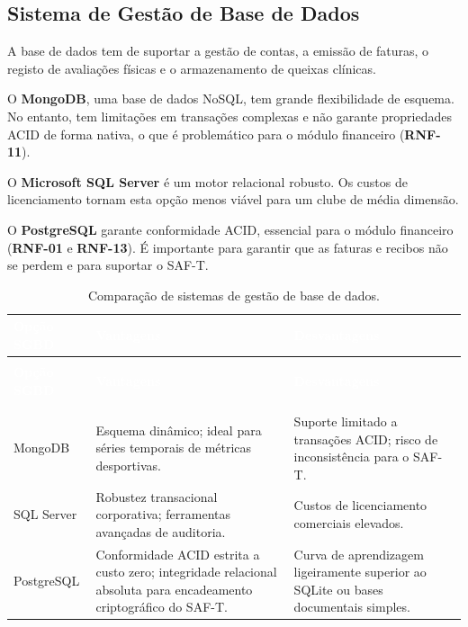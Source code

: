 \subsection{Sistema de Gestão de Base de Dados}

A base de dados tem de suportar a gestão de contas, a emissão de faturas, o registo de avaliações físicas e o armazenamento de queixas clínicas.

O \textbf{MongoDB}, uma base de dados NoSQL, tem grande flexibilidade de esquema. No entanto, tem limitações em transações complexas e não garante propriedades ACID de forma nativa, o que é problemático para o módulo financeiro (\textbf{RNF-11}).

O \textbf{Microsoft SQL Server} é um motor relacional robusto. Os custos de licenciamento tornam esta opção menos viável para um clube de média dimensão.

O \textbf{PostgreSQL} garante conformidade ACID, essencial para o módulo financeiro (\textbf{RNF-01} e \textbf{RNF-13}). É importante para garantir que as faturas e recibos não se perdem e para suportar o SAF-T.
\begin{center}
{\small
{}
\begin{xltabular}{\textwidth}{|>{\raggedright\arraybackslash}p{3cm}|>{\raggedright\arraybackslash}X|>{\raggedright\arraybackslash}X|}
\hline
{}\textcolor{white}{\textbf{Opção SGBD}} & \textcolor{white}{\textbf{Vantagens}} & \textcolor{white}{\textbf{Desvantagens}} \\ \hline
\endfirsthead

 \\
\hline
{}\textcolor{white}{\textbf{Opção SGBD}} & \textcolor{white}{\textbf{Vantagens}} & \textcolor{white}{\textbf{Desvantagens}} \\ \hline
\endhead

\hline {} \\ \hline \endfoot

\hline
\caption{Comparação de sistemas de gestão de base de dados.}
\label{tab:comparacao_sgbd} \\
\endlastfoot

MongoDB & Esquema dinâmico; ideal para séries temporais de métricas desportivas. & Suporte limitado a transações ACID; risco de inconsistência para o SAF-T. \\ \hline
SQL Server & Robustez transacional corporativa; ferramentas avançadas de auditoria. & Custos de licenciamento comerciais elevados. \\ \hline
PostgreSQL & Conformidade ACID estrita a custo zero; integridade relacional absoluta para encadeamento criptográfico do SAF-T. & Curva de aprendizagem ligeiramente superior ao SQLite ou bases documentais simples. \\ \hline
\end{xltabular}
}
\end{center}


